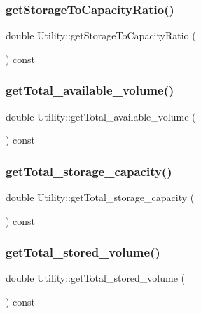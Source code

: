 \subsubsection{\texorpdfstring{get\+Storage\+To\+Capacity\+Ratio()}{getStorageToCapacityRatio()}}
{\footnotesize\ttfamily double Utility\+::get\+Storage\+To\+Capacity\+Ratio (\begin{DoxyParamCaption}{ }\end{DoxyParamCaption}) const}

\mbox{\label{classUtility_a6128e9ac10cc873773112593b5788d81}} 
\subsubsection{\texorpdfstring{get\+Total\+\_\+available\+\_\+volume()}{getTotal\_available\_volume()}}
{\footnotesize\ttfamily double Utility\+::get\+Total\+\_\+available\+\_\+volume (\begin{DoxyParamCaption}{ }\end{DoxyParamCaption}) const}

\mbox{\label{classUtility_a16f8269dc5f80c1d079c49f33495f620}} 
\subsubsection{\texorpdfstring{get\+Total\+\_\+storage\+\_\+capacity()}{getTotal\_storage\_capacity()}}
{\footnotesize\ttfamily double Utility\+::get\+Total\+\_\+storage\+\_\+capacity (\begin{DoxyParamCaption}{ }\end{DoxyParamCaption}) const}

\mbox{\label{classUtility_a5d932aef9e201e824ac681cd6928613a}} 
\subsubsection{\texorpdfstring{get\+Total\+\_\+stored\+\_\+volume()}{getTotal\_stored\_volume()}}
{\footnotesize\ttfamily double Utility\+::get\+Total\+\_\+stored\+\_\+volume (\begin{DoxyParamCaption}{ }\end{DoxyParamCaption}) const}

